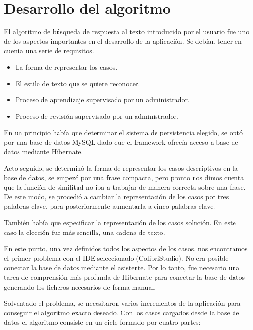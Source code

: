 \section{Desarrollo del algoritmo}

El algoritmo de búsqueda de respuesta al texto introducido por el usuario fue uno de los aspectos importantes en el desarrollo de la aplicación. Se debían tener en cuenta una serie de requisitos.

\begin{itemize}
\tightlist
\item
La forma de representar los casos.
\item
El estilo de texto que se quiere reconocer.
\item
Proceso de aprendizaje supervisado por un administrador.
\item
Proceso de revisión supervisado por un administrador.
\end{itemize}

En un principio había que determinar el sistema de persistencia elegido, se optó por una base de datos MySQL dado que el framework ofrecía acceso a base de datos mediante Hibernate.

Acto seguido, se determinó la forma de representar los casos descriptivos en la base de datos, se empezó por una frase compacta, pero pronto nos dimos cuenta que la función de similitud no iba a trabajar de manera correcta sobre una frase. De este modo, se procedió a cambiar la representación de los casos por tres palabras clave, para posteriormente aumentarla a cinco palabras clave.

También había que especificar la representación de los casos solución. En este caso la elección fue más sencilla, una cadena de texto.

En este punto, una vez definidos todos los aspectos de los casos, nos encontramos el primer problema con el IDE seleccionado (ColibriStudio). No era posible conectar la base de datos mediante el asistente. Por lo tanto, fue necesario una tarea de comprensión más profunda de Hibernate para conectar la base de datos generando los ficheros necesarios de forma manual.

Solventado el problema, se necesitaron varios incrementos de la aplicación para conseguir el algoritmo exacto deseado. Con los casos cargados desde la base de datos el algoritmo consiste en un ciclo formado por cuatro partes:

